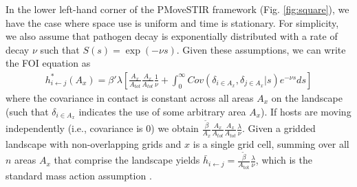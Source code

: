 \documentclass[letterpaper]{article}
\begin{document}
In the lower left-hand corner of the PMoveSTIR framework (Fig. \ref{fig:square}), we have the case where space use is uniform and time is stationary. For simplicity, we also assume that pathogen decay is exponentially distributed with a rate of decay $\nu$ such that $S(s) = \exp(-\nu s)$. Given these assumptions, we can write the FOI equation as
\begin{equation}
    \begin{aligned}
        h^*_{i \leftarrow j}(A_x) = \beta' \lambda \left[\frac{A_x}{A_{tot}}\frac{A_x}{A_{tot}} \frac{1}{\nu} +  \int_{0}^{\infty} Cov(\delta_{i \in A_x}, \delta_{j \in A_x} | s) e^{-\nu s} ds\right]
    \end{aligned}
    \label{eq:uniform_stationary1}
\end{equation}
where the covariance in contact is constant across all areas $A_x$ on the landscape (such that $\delta_{i \in A_x}$ indicates the use of some arbitrary area $A_x$).  
If hosts are moving independently (i.e., covariance is 0) we obtain $\frac{\tilde{\beta}}{A_x} \frac{A_x}{A_{tot}} \frac{A_x}{A_{tot}}  \frac{\lambda}{\nu}$. Given a gridded landscape with non-overlapping grids and $x$ is a single grid cell, summing over all $n$ areas $A_x$ that comprise the landscape yields $\bar{h}_{i \leftarrow j} =\frac{\tilde{\beta}}{A_\text{tot}} \frac{\lambda}{\nu}$, which is the standard mass action assumption \citep{McCallum2001}. 
\end{document}
